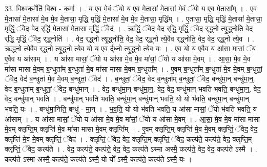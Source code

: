 \documentclass[17pt]{extarticle}
\begin{document}
33. वि॒श्वक॒र्मेति॑ वि॒श्व - क॒र्मा॒ । . य ए॒व मे॒वं ॅयो य ए॒व मे॒तासा॑ मे॒तासा॑ मे॒वं ॅयो य ए॒व मे॒तासा᳚म् । . ए॒व मे॒तासा॑ मे॒तासा॑ मे॒व मे॒व मे॒तासा॒ मृद्धि॒ मृद्धि॑ मे॒तासा॑ मे॒व मे॒व मे॒तासा॒ मृद्धि᳚म् । . ए॒तासा॒ मृद्धि॒ मृद्धि॑ मे॒तासा॑ मे॒तासा॒ मृद्धिं॒ ॅवेद॒ वेद र्‌द्धि॑ मे॒तासा॑ मे॒तासा॒ मृद्धिं॒ ॅवेद॑ । . ऋद्धिं॒ ॅवेद॒ वेद र्‌द्धि॒ मृद्धिं॒ ॅवेद॒ र्‌द्ध्नो त्यृ॒द्ध्नोति॒ वेद र्‌द्धि॒ मृद्धिं॒ ॅवेद॒ र्‌द्ध्नोति॑ । . वेद॒ र्‌द्ध्नो त्यृ॒द्ध्नोति॒ वेद॒ वेद॒ र्‌द्ध्नो त्ये॒वैव र्‌द्ध्नोति॒ वेद॒ वेद॒ र्‌द्ध्नो त्ये॒व । . ऋ॒द्ध्नो त्ये॒वैव र्‌द्ध्नो त्यृ॒द्ध्नो त्ये॒व यो य ए॒व र्द्‌ध्नो त्यृ॒द्ध्नो त्ये॒व यः । . ए॒व यो य ए॒वैव य आ॑सा मासां॒ ॅय ए॒वैव य आ॑साम् । . य आ॑सा मासां॒ ॅयो य आ॑सा मे॒व मे॒व मा॑सां॒ ॅयो य आ॑सा मे॒वम् । . आ॒सा॒ मे॒व मे॒व मा॑सा मासा मे॒वम् ब॒न्धुता᳚म् ब॒न्धुता॑ मे॒व मा॑सा मासा मे॒वम् ब॒न्धुता᳚म् । . ए॒वम् ब॒न्धुता᳚म् ब॒न्धुता॑ मे॒व मे॒वम् ब॒न्धुतां॒ ॅवेद॒ वेद॑ ब॒न्धुता॑ मे॒व मे॒वम् ब॒न्धुतां॒ ॅवेद॑ । . ब॒न्धुतां॒ ॅवेद॒ वेद॑ ब॒न्धुता᳚म् ब॒न्धुतां॒ ॅवेद॒ बन्धु॑मा॒न् बन्धु॑मा॒न्॒. वेद॑ ब॒न्धुता᳚म् ब॒न्धुतां॒ ॅवेद॒ बन्धु॑मान् । . वेद॒ बन्धु॑मा॒न् बन्धु॑मा॒न्॒. वेद॒ वेद॒ बन्धु॑मान् भवति भवति॒ बन्धु॑मा॒न्॒. वेद॒ वेद॒ बन्धु॑मान् भवति । . बन्धु॑मान् भवति भवति॒ बन्धु॑मा॒न् बन्धु॑मान् भवति॒ यो यो भ॑वति॒ बन्धु॑मा॒न् बन्धु॑मान् भवति॒ यः । . बन्धु॑मा॒निति॒ बन्धु॑ - मा॒न् । . भ॒व॒ति॒ यो यो भ॑वति भवति॒ य आ॑सा मासां॒ ॅयो भ॑वति भवति॒ य आ॑साम् । . य आ॑सा मासां॒ ॅयो य आ॑सा मे॒व मे॒व मा॑सां॒ ॅयो य आ॑सा मे॒वम् । . आ॒सा॒ मे॒व मे॒व मा॑सा मासा मे॒वम् क्लृप्ति॒म् क्लृप्ति॑ मे॒व मा॑सा मासा मे॒वम् क्लृप्ति᳚म् । . ए॒वम् क्लृप्ति॒म् क्लृप्ति॑ मे॒व मे॒वम् क्लृप्तिं॒ ॅवेद॒ वेद॒ क्लृप्ति॑ मे॒व मे॒वम् क्लृप्तिं॒ ॅवेद॑ । . क्लृप्तिं॒ ॅवेद॒ वेद॒ क्लृप्ति॒म् क्लृप्तिं॒ ॅवेद॒ कल्प॑ते॒ कल्प॑ते॒ वेद॒ क्लृप्ति॒म् क्लृप्तिं॒ ॅवेद॒ कल्प॑ते । . वेद॒ कल्प॑ते॒ कल्प॑ते॒ वेद॒ वेद॒ कल्प॑ते ऽस्मा अस्मै॒ कल्प॑ते॒ वेद॒ वेद॒ कल्प॑ते ऽस्मै । . कल्प॑ते ऽस्मा अस्मै॒ कल्प॑ते॒ कल्प॑ते ऽस्मै॒ यो यो᳚ ऽस्मै॒ कल्प॑ते॒ कल्प॑ते ऽस्मै॒ यः । \newline
\pagebreak
{}
\end{document}
